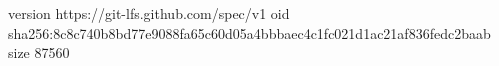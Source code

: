 version https://git-lfs.github.com/spec/v1
oid sha256:8c8c740b8bd77e9088fa65c60d05a4bbbaec4c1fc021d1ac21af836fedc2baab
size 87560
